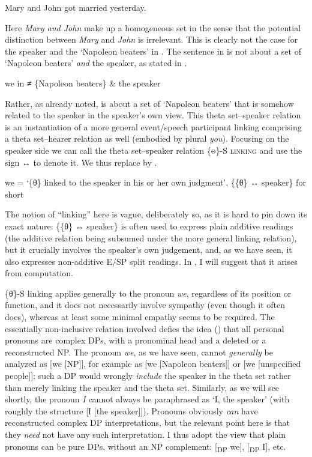 \documentclass[output=paper]{LSP/langsci}
\begin{document}
\ea%
    \label{ex:Sigurdsson:9}
  Mary and John got married yesterday.
\z

Here \textit{Mary and John} make up a homogeneous set in the sense that the potential distinction between \textit{Mary} and \textit{John} is irrelevant. This is clearly not the case for the speaker and the ‘Napoleon beaters’ in . The sentence in  is not about a set of ‘Napoleon beaters’ \textit{and} the speaker, as stated in .

\ea%
    \label{ex:Sigurdsson:10}
      we in  \textbf{≠} \{Napoleon beaters\} \& the speaker
\z

Rather, as already noted,  is about a set of ‘Napoleon beaters’ that is somehow related to the speaker in the speaker’s own view. This theta set–speaker relation is an instantiation of a more general event/speech participant linking comprising a theta set–hearer relation as well (embodied by plural \textit{you}). Focusing on the speaker side we can call the theta set–speaker relation \textsc{\{θ\}-S linking} and use the sign ↔ to denote it. We thus replace  by .

\ea%
    \label{ex:Sigurdsson:11}
   we = ‘\{θ\} linked to the speaker in his or her own judgment’, \{\{θ\} ↔ speaker\} for short
\z

The notion of ``linking'' here is vague, deliberately so, as it is hard to pin down its exact nature: \{\{θ\} ↔ speaker\} is often used to express plain additive readings (the additive relation being subsumed under the more general linking relation), but it crucially involves the speaker’s own judgement, and, as we have seen, it also expresses non-additive E/SP split readings. In , I will suggest that it arises from  computation.

  \{θ\}-S linking applies generally to the pronoun \textit{we}, regardless of its position or function, and it does not necessarily involve sympathy (even though it often does), whereas at least some minimal empathy seems to be required. The essentially non-inclusive relation involved defies the idea (\citealt{Postal1966,Elbourne2005}) that all personal pronouns are complex DPs, with a pronominal head and a deleted or a reconstructed NP. The pronoun \textit{we}, as we have seen, cannot \textit{generally} be analyzed as [we [NP]], for example as [we [Napoleon beaters]] or [we [unspecified people]]; such a DP would wrongly \textit{include} the speaker in the theta set rather than merely linking the speaker and the theta set. Similarly, as we will see shortly, the pronoun \textit{I} cannot always be paraphrased as ‘I, the speaker’ (with roughly the structure [I [the speaker]]). Pronouns obviously \textit{can} have reconstructed complex DP interpretations, but the relevant point here is that they \textit{need} not have any such interpretation. I thus adopt the view that plain pronouns can be pure DPs, without an NP complement: [\textsubscript{DP} we], [\textsubscript{DP} I], etc.
\end{document}
